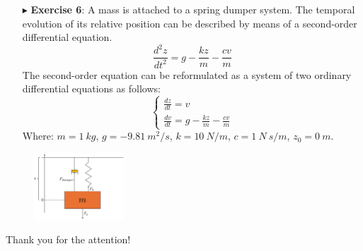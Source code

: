 \documentclass[xcolor={dvipsnames,rgb}, aspectratio=169]{beamer}
\begin{document}
\begin{frame}{}
   \begin{itemize}
      \item[$\blacktriangleright$] \textbf{Exercise 6}: \footnotesize{A mass is attached
         to a spring dumper system. The temporal evolution of its relative position can
         be described by means of a second-order differential equation.
         \begin{equation*}
            \frac{d^2 z}{dt^2} = g - \frac{kz}{m} - \frac{cv}{m}
         \end{equation*}
         The second-order equation can be reformulated as a system of two ordinary
         differential equations as follows:
         \begin{equation*}
            \begin{cases}
               \frac{dz}{dt} = v \\
               \frac{dv}{dt} =  g - \frac{kz}{m} - \frac{cv}{m}
            \end{cases}
         \end{equation*}
         Where: $m = 1 \: kg$, $g = -9.81 \: m^2 /s$, $k=10 \: N/m$, $c=1\: N\:s/m$, $z_0
         = 0\: m$.}
   \end{itemize}
   \begin{figure}
      \centering
      \includegraphics[width=0.3\textwidth]{figures/MassSpringDumper.pdf}
   \end{figure}
\end{frame}

{%
\begin{frame}[standout]
	Thank you for the attention!
\end{frame}
}
\end{document}
